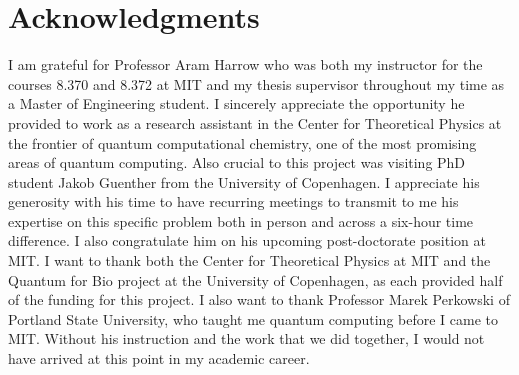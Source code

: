 

\chapter*{Acknowledgments}

I am grateful for Professor Aram Harrow who was both my instructor for the courses 8.370 and 8.372 at MIT and my thesis supervisor throughout my time as a Master of Engineering student. I sincerely appreciate the opportunity he provided to work as a research assistant in the Center for Theoretical Physics at the frontier of quantum computational chemistry, one of the most promising areas of quantum computing. Also crucial to this project was visiting PhD student Jakob Guenther from the University of Copenhagen. I appreciate his generosity with his time to have recurring meetings to transmit to me his expertise on this specific problem both in person and across a six-hour time difference. I also congratulate him on his upcoming post-doctorate position at MIT. I want to thank both the Center for Theoretical Physics at MIT and the Quantum for Bio project at the University of Copenhagen, as each provided half of the funding for this project.
I also want to thank Professor Marek Perkowski of Portland State University, who taught me quantum computing before I came to MIT. Without his instruction and the work that we did together, I would not have arrived at this point in my academic career.